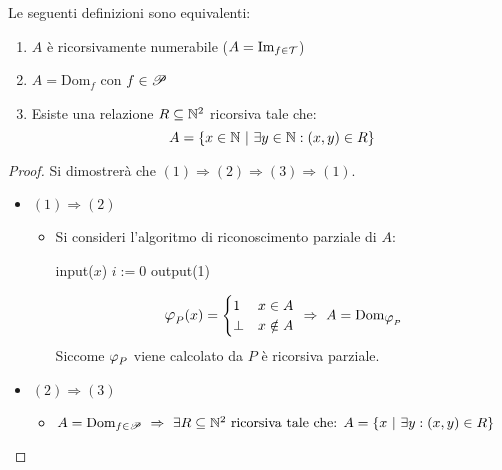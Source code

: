 \begin{theorem}
    Le seguenti definizioni sono equivalenti:
    \begin{enumerate}
        \item $A$ è ricorsivamente numerabile ($A=\text{Im}_{f\in\mathcal{T}}$)
        \item $A=\text{Dom}_f$ con $f\in\mathscr{P}$
        \item Esiste una relazione $R\subseteq\mathbb{N}^2$ ricorsiva tale che:
            $$ A=\{ x\in\mathbb{N}\ |\ \exists y\in\mathbb{N} : (x,y)\in R \} $$ 
    \end{enumerate}
\end{theorem}
\begin{proof}
    Si dimostrerà che $(1)\Rightarrow(2)\Rightarrow(3)\Rightarrow(1)$.
    \begin{itemize}
        \item $(1)\Rightarrow(2)$
        \begin{itemize}
            \item[] Si consideri l'algoritmo di riconoscimento parziale di $A$:
            
            \begin{minipage}{.32\textwidth}
                \begin{tcolorbox}[
                    colback=white,
                    sharp corners,
                    boxrule=.3mm,
                    left=20pt,
                    top=0pt,
                    bottom=0pt,
                    title=$P$,
                    colbacktitle=white,
                    coltitle=black
                ]
                \begin{algorithm}[H]
                    \SetAlgoNoEnd
                    input($x$)\;
                    $i:=0$\;
                    output(1)\;
                \end{algorithm}
                \end{tcolorbox}
            \end{minipage}\hspace{1em}
            \begin{minipage}{.50\textwidth}
                $$ \semRAM_P(x) = \begin{cases}
                    1 & x\in A\\
                    \perp & x\notin A
                \end{cases}\ \Rightarrow \ A=\text{Dom}_{\semRAM_P} $$
                Siccome $\semRAM_P$ viene calcolato da $P$ è ricorsiva parziale.
            \end{minipage}\vspace{1em}
        \end{itemize}
        \item $(2)\Rightarrow(3)$
        \begin{itemize}
            \item[] $A=\text{Dom}_{f\in\ricPar}\ \Rightarrow \ \exists R\subseteq\N^2
            \text{ ricorsiva tale che: }A=\{ x\ |\ \exists y:(x,y)\in R\}$


\end{itemize}
\end{itemize}
\end{proof}
